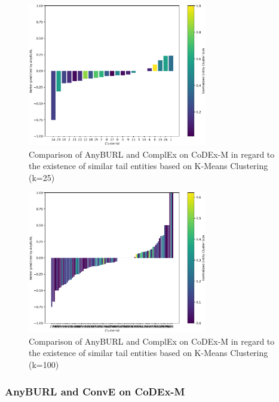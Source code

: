 \begin{figure}[H]
\centering
\includegraphics[width=0.7\textwidth]{images/tail_cluster_25_anyburl_complex_codex.PNG}
\caption{Comparison of AnyBURL and ComplEx on CoDEx-M in regard to the existence of similar tail entities based on K-Means Clustering (k=25)}
\label{fig:tail_cluster_25_anyburl_complex_codex}
\end{figure}

\begin{figure}[H]
\centering
\includegraphics[width=0.7\textwidth]{images/tail_cluster_100_anyburl_complex_codex.PNG}
\caption{Comparison of AnyBURL and ComplEx on CoDEx-M in regard to the existence of similar tail entities based on K-Means Clustering (k=100)}
\label{fig:tail_cluster_100_anyburl_complex_codex}
\end{figure}

\subsubsection{AnyBURL and ConvE on CoDEx-M}

